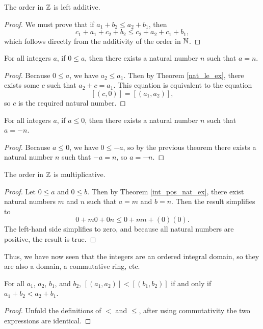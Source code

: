 \documentclass[../../math.tex]{subfiles}
\begin{document}
\begin{instance}
    The order in $\mathbb{Z}$ is left additive.
\end{instance}
\begin{proof}
    We must prove that if $a_1 + b_2 \leq a_2 + b_1$, then
    \[
        c_1 + a_1 + c_2 + b_2 \leq c_2 + a_2 + c_1 + b_1,
    \]
    which follows directly from the additivity of the order in $\mathbb{N}$.
\end{proof}

\begin{theorem} \label{int_pos_nat_ex}
    For all integers $a$, if $0 \leq a$, then there exists a natural number $n$
    such that $a = n$.
\end{theorem}
\begin{proof}
    Because $0 \leq a$, we have $a_2 \leq a_1$.  Then by Theorem
    \ref{nat_le_ex}, there exists some $c$ such that $a_2 + c = a_1$.  This
    equation is equivalent to the equation
    \[
        [(c, 0)] = [(a_1, a_2)],
    \]
    so $c$ is the required natural number.
\end{proof}

\begin{theorem} \label{int_neg_nat_ex}
    For all integers $a$, if $a \leq 0$, then there exists a natural number $n$
    such that $a = -n$.
\end{theorem}
\begin{proof}
    Because $a \leq 0$, we have $0 \leq -a$, so by the previous theorem there
    exists a natural number $n$ such that $-a = n$, so $a = -n$.
\end{proof}

\begin{instance}
    The order in $\mathbb{Z}$ is multiplicative.
\end{instance}
\begin{proof}
    Let $0 \leq a$ and $0 \leq b$.  Then by Theorem \ref{int_pos_nat_ex}, there
    exist natural numbers $m$ and $n$ such that $a = m$ and $b = n$.  Then the
    result simplifies to
    \[
        0 + m0 + 0n \leq 0 + mn + (0)(0).
    \]
    The left-hand side simplifies to zero, and because all natural numbers are
    positive, the result is true.
\end{proof}

Thus, we have now seen that the integers are an ordered integral domain, so they
are also a domain, a commutative ring, etc.

\begin{theorem}
    For all $a_1$, $a_2$, $b_1$, and $b_2$, $[(a_1, a_2)] < [(b_1, b_2)]$ if and
    only if $a_1 + b_2 < a_2 + b_1$.
\end{theorem}
\begin{proof}
    Unfold the definitions of $<$ and $\leq$, after using commutativity the two
    expressions are identical.
\end{proof}
\end{document}
